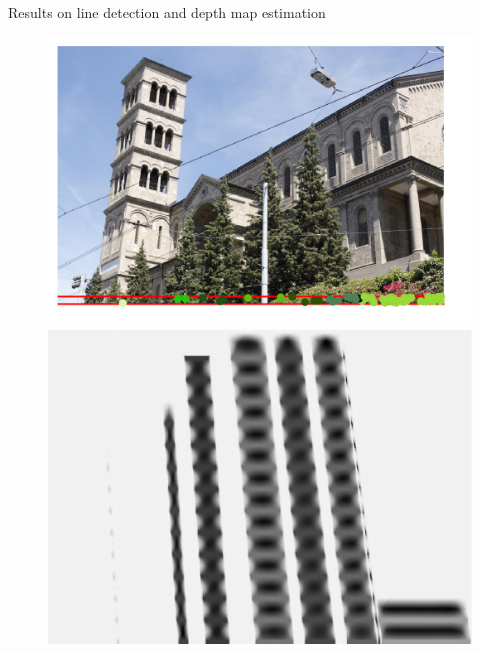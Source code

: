 \begin{frame}{Results on line detection and depth map estimation}
\begin{figure}[!tbp]
  \centering
  \begin{minipage}[b]{0.40\textwidth}
    \includegraphics[width=\textwidth]{./images/EPI-strip.png}
  \end{minipage}
	\pause
  \begin{minipage}[b]{0.40\textwidth}
    \includegraphics[width=\textwidth]{./images/EPI-inpainted.png}
  \end{minipage}
\end{figure}
\pause


\end{frame}

